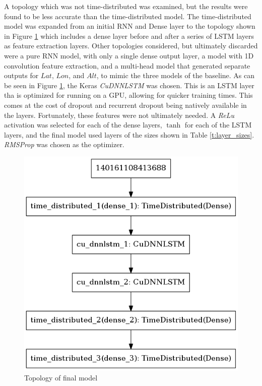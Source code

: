 \documentclass[10pt]{IEEEtran}
\begin{document}
A topology which was not time-distributed was examined, but the results were found to be less accurate than the time-distributed model. The time-distributed model was expanded from an initial RNN and Dense layer to the topology shown in Figure \ref{f:topology} which includes a dense layer before and after a series of LSTM layers as feature extraction layers. Other topologies considered, but ultimately discarded were a pure RNN model, with only a single dense output layer, a model with 1D convolution feature extraction, and a multi-head model that generated separate outputs for $Lat$, $Lon$, and $Alt$, to mimic the three models of the baseline. As can be seen in Figure \ref{f:topology}, the Keras \textit{CuDNNLSTM} was chosen. This is an LSTM layer tha is optimized for running on a GPU, allowing for quicker training times. This comes at the cost of dropout and recurrent dropout being natively available in the layers. Fortunately, these features were not ultimately needed. A \textit{ReLu} activation was selected for each of the dense layers, $\tanh$ for each of the LSTM layers, and the final model used layers of the sizes shown in Table \ref{t:layer_sizes}. \textit{RMSProp} was chosen as the optimizer.

\begin{figure}
    \includegraphics[width=0.95\columnwidth]{model_topology.png}
    \caption{Topology of final model}
    \label{f:topology}
\end{figure}
\end{document}
